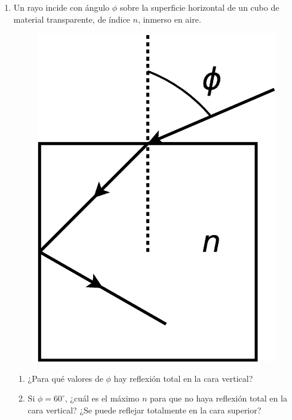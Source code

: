 \documentclass[11pt,spanish]{article}
\begin{document}
\begin{enumerate}
    \item Un rayo incide con ángulo $\phi$ sobre la superficie horizontal de
    un cubo de material transparente, de índice $n$, inmerso en aire.
    \begin{figure}[H]
        \centering{}\includegraphics[clip,scale=0.25]{figs/ej3-5}
    \end{figure}
    
    \begin{enumerate}
        \item ¿Para qué valores de $\phi$ hay reflexión total en la cara
        vertical?
        
        \item Si $\phi=60^{\circ}$, ¿cuál es el máximo $n$ para que no haya
        reflexión total en la cara vertical? ¿Se puede reflejar totalmente en
        la cara superior?
    \end{enumerate}


\end{enumerate}
\end{document}

